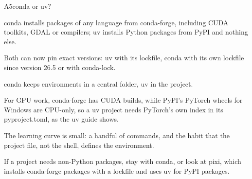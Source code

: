 \begin{frame}[source={conda (2026) · Astral (2026), uv: PyTorch integration · prefix.dev (2026), pixi}]{A5\enspace conda or uv?}
{    conda installs packages of any language from conda-forge, including CUDA toolkits, GDAL or
      compilers; uv installs Python packages from PyPI and nothing else.\par
    Both can now pin exact versions: uv with its lockfile, conda with its own lockfile since
      version 26.5 or with conda-lock.\par
    conda keeps environments in a central folder, uv in the project.\par
    For GPU work, conda-forge has CUDA builds, while PyPI's PyTorch wheels for Windows are
      CPU-only, so a uv project needs PyTorch's own index in its pyproject.toml, as the uv guide
      shows.\par
    The learning curve is small: a handful of commands, and the habit that the project file, not
      the shell, defines the environment.\par
    If a project needs non-Python packages, stay with conda, or look at pixi, which installs
      conda-forge packages with a lockfile and uses uv for PyPI packages.}
\end{frame}

